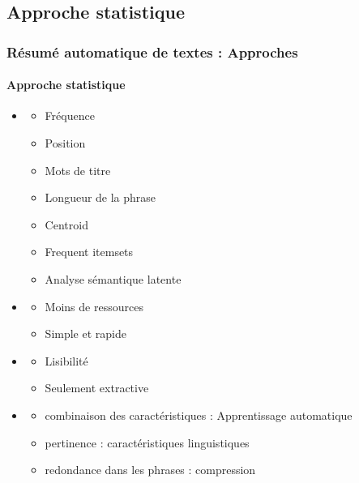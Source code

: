 \documentclass[xcolor=table]{beamer}
\begin{document}
\subsection{Approche statistique} 

\begin{frame}
\frametitle{Résumé automatique de textes : Approches}
\framesubtitle{Approche statistique}

\begin{itemize}
	\item {}
	\vspace{-.5cm}
	\begin{multicols}{3}
		\begin{itemize}
			\item Fréquence
			\item Position
			\item Mots de titre
			\item Longueur de la phrase
			\item Centroid
			\item Frequent itemsets
			\item Analyse sémantique latente
		\end{itemize}
	\end{multicols}

	\item {}
	\vspace{-.5cm}
	\begin{multicols}{2}
		\begin{itemize}
			\item Moins de ressources
			\item Simple et rapide
		\end{itemize}
	\end{multicols}

	\item {}
	\vspace{-.5cm}
	\begin{multicols}{2}
		\begin{itemize}
			\item Lisibilité
			\item Seulement extractive
		\end{itemize}
	\end{multicols}
	
	\item {}
	\begin{itemize}
		\item combinaison des caractéristiques : Apprentissage automatique
		\item pertinence : caractéristiques linguistiques
		\item redondance dans les phrases : compression
	\end{itemize}

\end{itemize}
	
\end{frame}
\end{document}
